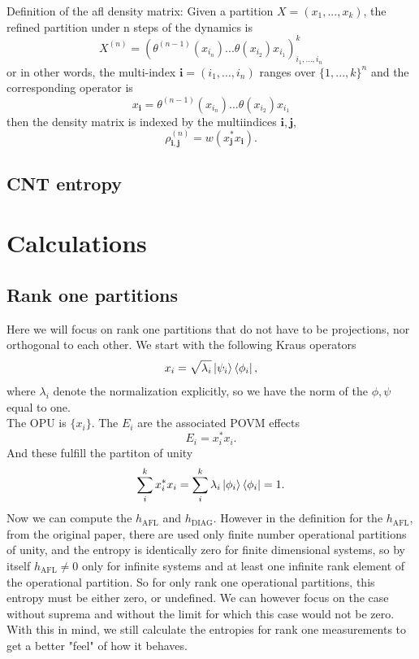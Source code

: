 \documentclass{article}
\newcommand{\afl}{h_{\text{AFL}}}
\newcommand{\diag}{h_{\text{DIAG}}}
\begin{document}
Definition of the afl density matrix: 
Given a partition $X = (x_1, ...,x_k)$, the refined partition under n steps of the dynamics is 
\begin{equation}
    X^{(n)} = (\theta^{(n-1)}(x_{i_n})...\theta(x_{i_2})x_{i_1})_{i_1,...,i_n}^k
\end{equation}
or in other words, the multi-index $\mathbf{i} = (i_1,...,i_n)$ ranges over $\{1,...,k\}^n$ and the corresponding operator is 
\begin{equation}
    x_\mathbf{i} = \theta^{(n-1)}(x_{i_n})...\theta(x_{i_2})x_{i_1}
\end{equation}
then the density matrix is indexed by the multiindices $\mathbf{i},\mathbf{j}$,
\begin{equation}
    \rho_{\mathbf{i},\mathbf{j}}^{(n)} = w(x_\mathbf{j}^*x_\mathbf{i}).
\end{equation}
\subsection{CNT entropy}

\section{Calculations}
\subsection{Rank one partitions}
Here we will focus on rank one partitions that do not have to be projections, nor orthogonal to each other. We start with the following Kraus operators
\begin{equation}
    x_i = \sqrt{\lambda_i}\ket{\psi_i}\bra{\phi_i},
\end{equation}
where $\lambda_i$ denote the normalization explicitly, so we have the norm of the $\phi,\psi$ equal to one. \\
The OPU is $\{x_i\}$. The $E_i$ are the associated POVM effects
\begin{equation}
    E_i = x_i^*x_i.
\end{equation}
And these fulfill the partiton of unity
\begin{equation}
    \sum_i^kx_i^*x_i = \sum_i^k\lambda_i\ket{\phi_i}\bra{\phi_i} = 1.
\end{equation}
Now we can compute the $\afl$ and $\diag$. However in the definition for the $\afl$, from the original paper, there are used only finite number operational partitions of unity, and the entropy is identically zero for finite dimensional systems, so by itself $\afl \neq 0$ only for infinite systems and at least one infinite rank element of the operational partition. So for only rank one operational partitions, this entropy must be either zero, or undefined. We can however focus on the case without suprema and without the limit for which this case would not be zero. With this in mind, we still calculate the entropies for rank one measurements to get a better "feel" of how it behaves. 
\end{document}
